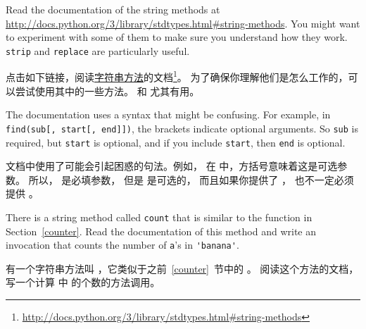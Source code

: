 \begin{exercise}
  

Read the documentation of the string methods at
\url{http://docs.python.org/3/library/stdtypes.html#string-methods}.
You might want to experiment with some of them to make sure you
understand how they work.  {\tt strip} and {\tt replace} are
particularly useful.

点击如下链接，阅读\href{http://docs.python.org/3/library/stdtypes.html#string-methods}{字符串方法}的文档\footnote{\url{http://docs.python.org/3/library/stdtypes.html#string-methods}}。 为了确保你理解他们是怎么工作的，可以尝试使用其中的一些方法。  和  尤其有用。

The documentation uses a syntax that might be confusing.
For example, in \verb"find(sub[, start[, end]])", the brackets
indicate optional arguments.  So {\tt sub} is required, but
{\tt start} is optional, and if you include {\tt start},
then {\tt end} is optional.

文档中使用了可能会引起困惑的句法。例如， 在  中，方括号意味着这是可选参数。 所以， 是必填参数， 但是  是可选的， 而且如果你提供了  ， 也不一定必须提供  。

  

\end{exercise}


\begin{exercise}
  

There is a string method called {\tt count} that is similar
to the function in Section~\ref{counter}.  Read the documentation
of this method
and write an invocation that counts the number of {\tt a}'s
in \verb"'banana'".

有一个字符串方法叫  ，它类似于之前~\ref{counter}~节中的  。 阅读这个方法的文档， 写一个计算  中  的个数的方法调用。


\end{exercise}


